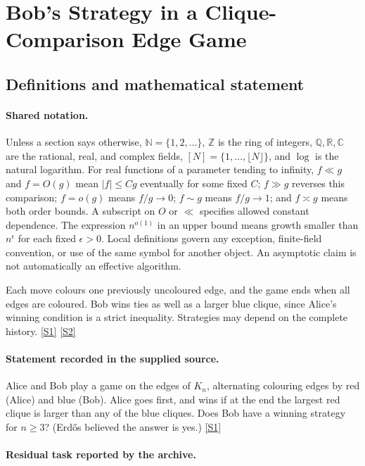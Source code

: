 \documentclass[11pt,a4paper]{article}
\newcommand{\N}{\mathbb{N}}
\newcommand{\Z}{\mathbb{Z}}
\newcommand{\Q}{\mathbb{Q}}
\newcommand{\R}{\mathbb{R}}
\newcommand{\C}{\mathbb{C}}
\newcommand{\sref}[2]{\hyperlink{source:#1:#2}{[S#2]}}
\begin{document}
\section{Bob's Strategy in a Clique-Comparison Edge Game}\label{statement}


\subsection{Definitions and mathematical statement}

\paragraph{Shared notation.}Unless a section says otherwise, $\N=\{1,2,\ldots\}$,
$\Z$ is the ring of integers, $\Q,\R,\C$ are the rational, real, and complex
fields, $[N]=\{1,\ldots,\lfloor N\rfloor\}$, and $\log$ is the natural
logarithm. For real functions of a parameter tending to infinity,
$f\ll g$ and $f=O(g)$ mean $|f|\leq Cg$ eventually for some fixed $C$;
$f\gg g$ reverses this comparison; $f=o(g)$ means $f/g\to0$;
$f\sim g$ means $f/g\to1$; and $f\asymp g$ means both order bounds.
A subscript on $O$ or $\ll$ specifies allowed constant dependence.
The expression $n^{o(1)}$ in an upper bound means growth smaller than
$n^\epsilon$ for each fixed $\epsilon>0$. Local definitions govern any
exception, finite-field convention, or use of the same symbol for another
object. An asymptotic claim is not automatically an effective algorithm.



Each move colours one previously uncoloured edge, and the game ends when all edges are coloured. Bob wins ties as well as a larger blue clique, since Alice's winning condition is a strict inequality. Strategies may depend on the complete history. \sref{statement}{1} \sref{statement}{2}

\paragraph{Statement recorded in the supplied source.}
Alice and Bob play a game on the edges of $K_n$, alternating colouring edges by red (Alice) and blue (Bob). Alice goes first, and wins if at the end the largest red clique is larger than any of the blue cliques.
Does Bob have a winning strategy for $n\geq 3$? (Erd\H{o}s believed the answer is yes.) \sref{statement}{1}

\paragraph{Residual task reported by the archive.}
\end{document}
